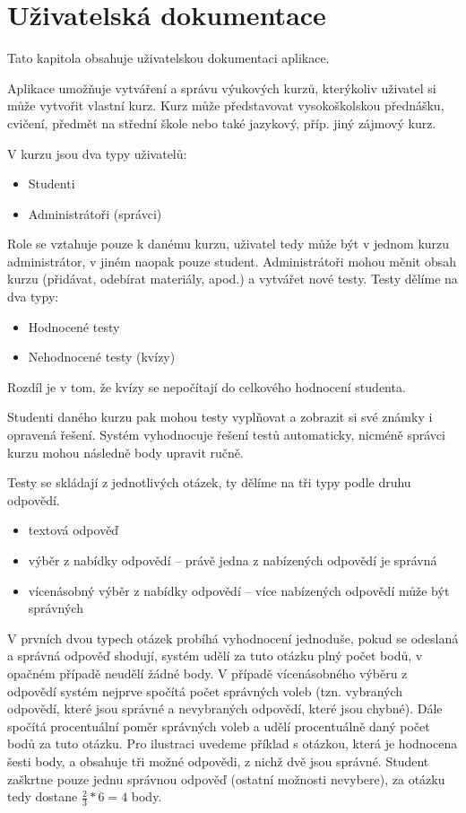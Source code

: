 \section{Uživatelská dokumentace}

Tato kapitola obsahuje uživatelskou dokumentaci aplikace.

Aplikace umožňuje vytváření a správu výukových kurzů, kterýkoliv uživatel si může vytvořit vlastní kurz.
Kurz může představovat vysokoškolskou přednášku, cvičení, předmět na střední škole nebo také jazykový, příp. jiný zájmový kurz.

V kurzu jsou dva typy uživatelů:
\begin{itemize}
	\item Studenti
	\item Administrátoři (správci)
\end{itemize}

Role se vztahuje pouze k danému kurzu, uživatel tedy může být v jednom kurzu administrátor, v jiném naopak pouze student. 
Administrátoři mohou měnit obsah kurzu (přidávat, odebírat materiály, apod.) a vytvářet nové testy. 
Testy dělíme na dva typy:

\begin{itemize}
	\item Hodnocené testy
	\item Nehodnocené testy (kvízy)
\end{itemize}

Rozdíl je v tom, že kvízy se nepočítají do celkového hodnocení studenta.

Studenti daného kurzu pak mohou testy vyplňovat a zobrazit si své známky i opravená řešení.
Systém vyhodnocuje řešení testů automaticky, nicméně správci kurzu mohou následně body upravit ručně. 

Testy se skládají z jednotlivých otázek, ty dělíme na tři typy podle druhu odpovědí.
\begin{itemize}
	\item textová odpověď
	\item výběr z nabídky odpovědí -- právě jedna z nabízených odpovědí je správná
	\item vícenásobný výběr z nabídky odpovědí -- více nabízených odpovědí může být správných
\end{itemize}

V prvních dvou typech otázek probíhá vyhodnocení jednoduše, pokud se odeslaná a správná odpověď shodují, systém udělí za tuto otázku plný počet bodů, v opačném případě neudělí žádné body.
V případě vícenásobného výběru z odpovědí systém nejprve spočítá počet správných voleb (tzn. vybraných odpovědí, které jsou správné a nevybraných odpovědí, které jsou chybné).
Dále spočítá procentuální poměr správných voleb a udělí procentuálně daný počet bodů za tuto otázku.
Pro ilustraci uvedeme příklad s otázkou, která je hodnocena šesti body, a obsahuje tři možné odpovědi, z nichž dvě jsou správné. Student zaškrtne pouze jednu správnou odpověď (ostatní možnosti nevybere), za otázku tedy dostane $\frac{2}{3} * 6 = 4$ body.

